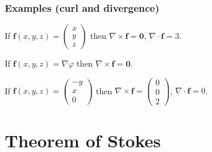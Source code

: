 \documentclass[aspectratio=169]{beamer}
\newcommand{\ff}{\mathbf{f}}
\begin{document}
\begin{frame}
    \frametitle{Examples (curl and divergence)}

    \begin{example}
        If \(\ff(x,y,z) = \begin{pmatrix}
            x \\ y \\ z
        \end{pmatrix}\)
        then
        \(\nabla \times \ff = \mathbf{0}\),
        \(\nabla \cdot \ff = 3\).
    \end{example}

    \begin{example}
        If \(\ff(x,y,z) = \nabla \varphi\)
        then
        \(\nabla \times \ff = \mathbf{0}\).
    \end{example}


    \begin{example}
        If \(\ff(x,y,z) = \begin{pmatrix}
            -y \\ x \\ 0
        \end{pmatrix}\)
        then
        \(\nabla \times \ff = \begin{pmatrix}
            0 \\ 0 \\ 2
        \end{pmatrix}\),
        \(\nabla \cdot \ff = 0\).
    \end{example}

\end{frame}

\section{Theorem of Stokes}
\end{document}
